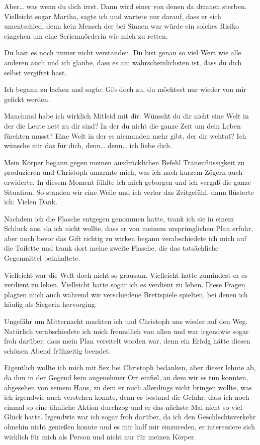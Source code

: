 \documentclass[11pt, a5paper]{article}
\newcommand{\e}{Christoph }
\newcommand{\Gf}{Martha}
\begin{document}
\begin{spacing}{1.2}
		\frqq Aber… was wenn du dich irrst. Dann wird einer von denen da drinnen sterben. Vielleicht sogar \Gf \flqq , sagte ich und wartete nur darauf, dass er sich umentschied, denn kein Mensch der bei Sinnen war würde ein solches Risiko eingehen um eine Serienmörderin wie mich zu retten.
		
		\frqq Du hast es noch immer nicht verstanden. Du bist genau so viel Wert wie alle anderen auch und ich glaube, dass es am wahrscheinlichsten ist, dass du dich selbst vergiftet hast.\flqq
		
		Ich begann zu lachen und sagte: \frqq Gib doch zu, du möchtest nur wieder von mir gefickt werden.\flqq
		
		\frqq Manchmal habe ich wirklich Mitleid mit dir. Wünscht du dir nicht eine Welt in der die Leute nett zu dir sind? In der du nicht die ganze Zeit um dein Leben fürchten musst? Eine Welt in der es niemanden mehr gibt, der dir wehtut? Ich wünsche mir das für dich, denn… denn… ich liebe dich.\flqq
		
		Mein Körper begann gegen meinen ausdrücklichen Befehl Tränenflüssigkeit zu produzieren und \e umarmte mich, was ich nach kurzem Zögern auch erwiderte. In diesem Moment fühlte ich mich geborgen und ich vergaß die ganze Situation. So standen wir eine Weile und ich verlor das Zeitgefühl, dann flüsterte ich: \frqq Vielen Dank.\flqq
		
		Nachdem ich die Flasche entgegen genommen hatte, trank ich sie in einem Schluck aus, da ich nicht wollte, dass er von meinem ursprünglichen Plan erfuhr, aber noch bevor das Gift richtig zu wirken begann verabschiedete ich mich auf die Toilette und trank dort meine zweite Flasche, die das tatsächliche Gegenmittel beinhaltete.
		
		Vielleicht war die Welt doch nicht so grausam. Vielleicht hatte zumindest er es verdient zu leben. Vielleicht hatte sogar ich es verdient zu leben. Diese Fragen plagten mich auch während wir verschiedene Brettspiele spielten, bei denen ich häufig als Siegerin hervorging.
		
		Ungefähr um Mitternacht machten ich und \e uns wieder auf den Weg. Natürlich verabschiedete ich mich freundlich von allen und war irgendwie sogar froh darüber, dass mein Plan vereitelt worden war, denn ein Erfolg hätte diesen schönen Abend frühzeitig beendet.
		
		Eigentlich wollte ich mich mit Sex bei \e bedanken, aber dieser lehnte ab, da ihm in der Gegend kein angenehmer Ort einfiel, an dem wir es tun konnten, abgesehen von seinem Haus, zu dem er mich allerdings nicht bringen wollte, was ich irgendwie auch verstehen konnte, denn es bestand die Gefahr, dass ich noch einmal so eine ähnliche Aktion durchzog und er das nächste Mal nicht so viel Glück hatte. Irgendwie war ich sogar froh darüber, da ich den Geschlechtsverkehr ohnehin nicht genießen konnte und es mir half mir einzureden, er interessiere sich wirklich für mich als Person und nicht nur für meinen Körper.\\
		

\end{spacing}
\end{document}
